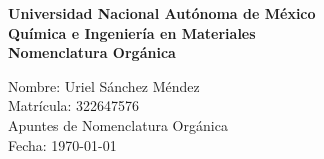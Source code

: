 \documentclass[12pt]{article}
\renewcommand{\headrulewidth}{0pt}
\newcommand{\activarEncabezado}[1]{%
  \fancyhead[L]{\small\textcolor{blueunam}{#1}}%
  \fancyhead[R]{\small\textcolor{blueunam}{\nouppercase{\leftmark}}}%
  \renewcommand{\headrulewidth}{0.4pt}%
  \renewcommand{\headrule}{\hbox to\headwidth{\color{blueunam}\leaders\hrule height \headrulewidth\hfill}}%
}
\begin{document}
\begin{titlepage}
\thispagestyle{empty}
\begin{center}
\vspace*{2cm}
\fontsize{14}{30}\selectfont\textbf{Universidad Nacional Autónoma de México} \\
\vspace{1cm}
\fontsize{14}{30}\selectfont\textbf{Química e Ingeniería en Materiales} \\
\vspace{1cm}
\fontsize{14}{30}\selectfont\textbf{Nomenclatura Orgánica} \\
\end{center}
\vspace{2cm}
\begin{flushright}
    \fontsize{14}{30}\selectfont
        \hspace{2cm} Nombre: Uriel Sánchez Méndez \\
        \hspace{2cm} Matrícula: 322647576 \\
        \hspace{2cm} Apuntes de Nomenclatura Orgánica \\
        \hspace{2cm} Fecha: \today \\
\end{flushright}
\end{titlepage}

\tableofcontents
\thispagestyle{empty}
\newpage




\end{document}
